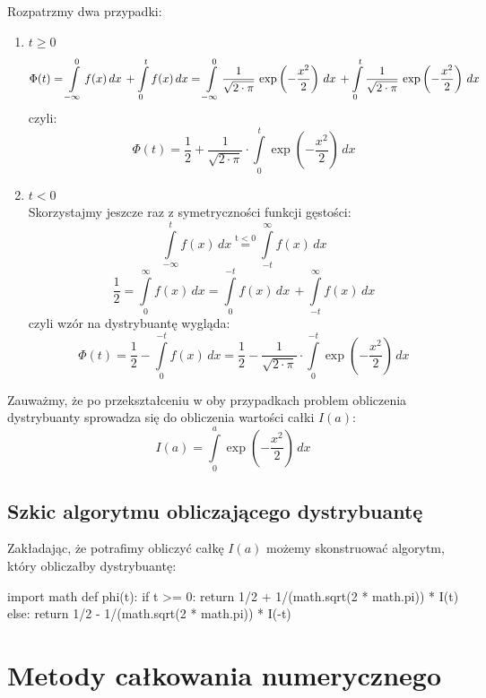\documentclass[a4paper]{article}
\begin{document}
Rozpatrzmy dwa przypadki:
\begin{enumerate}
\item $t \geq 0$
$$\Phi(t) = \int\limits_{-\infty}^0 f(x)\,dx \,+ \int\limits_{0}^t f(x)\,dx = \int\limits_{-\infty}^0 \frac{1}{\sqrt{2\cdot\pi}}\,\exp\left(-\frac{x^2}{2}\right)\,dx \newline \,+ \int\limits_{0}^t \frac{1}{\sqrt{2\cdot\pi}}\,\exp\left(-\frac{x^2}{2}\right)\,dx$$
czyli:
$$\Phi(t) = \frac{1}{2} + \frac{1}{\sqrt{2\cdot\pi}} \cdot \int\limits_{0}^t \exp\left(-\frac{x^2}{2}\right)\,dx$$
\item $t < 0$
\\ Skorzystajmy jeszcze raz z symetryczności funkcji gęstości:
$$\int\limits_{-\infty}^t f(x)\,dx \stackrel{\text{t < 0}}{=}
 \int\limits_{-t}^{\infty} f(x)\,dx $$
 $$\frac{1}{2} = \int\limits_{0}^{\infty} f(x)\,dx = \int\limits_{0}^{-t} f(x)\,dx \, + \int\limits_{-t}^{\infty} f(x)\,dx$$
 czyli wzór na dystrybuantę wygląda:
 $$\Phi(t) = \frac{1}{2} - \int\limits_{0}^{-t} f(x)\,dx = \frac{1}{2} - \frac{1}{\sqrt{2\cdot\pi}} \cdot \int\limits_{0}^{-t} \exp\left(-\frac{x^2}{2}\right)\,dx$$
\end{enumerate}
Zauważmy, że po przekształceniu w oby przypadkach problem obliczenia dystrybuanty sprowadza się do obliczenia wartości całki $I(a)$:
$$I(a) = \int\limits_{0}^{a} \exp\left(-\frac{x^2}{2}\right)\,dx $$
\subsection{Szkic algorytmu obliczającego dystrybuantę}
Zakładając, że potrafimy obliczyć całkę $I(a)$ możemy skonstruować algorytm, który obliczałby dystrybuantę:
\begin{python}
import math
def phi(t):
	if t >= 0:
		return 1/2 + 1/(math.sqrt(2 * math.pi)) * I(t)
	else:
		return 1/2 - 1/(math.sqrt(2 * math.pi)) * I(-t)
\end{python}
\section{Metody całkowania numerycznego}
\end{document}
